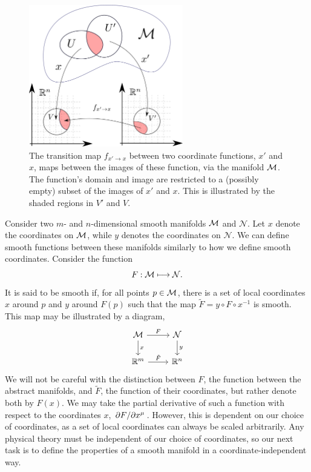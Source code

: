 %
\begin{figure}[H]
    \centering
    \includegraphics[width=0.6\textwidth]{figurer/transition_map.pdf}
    \caption{
        The transition map $f_{x'\rightarrow x}$ between two coordinate functions, $x'$ and $x$, maps between the images of these function, via the manifold $\mathcal{M}$. 
        The function's domain and image are restricted to a (possibly empty) subset of the images of $x'$ and $x$. This is illustrated by the shaded regions in $V'$ and $V$. 
        }
    \label{fig: transition map}
\end{figure}

Consider two $m$- and $n$-dimensional smooth manifolds $\mathcal{M}$ and $\mathcal N$.
Let $x$ denote the coordinates on $\mathcal{M}$, while $y$ denotes the coordinates on $\mathcal N$.
We can define smooth functions between these manifolds similarly to how we define smooth coordinates.
Consider the function
%
\begin{equation}
    F: \mathcal{M} \longmapsto \mathcal N.
\end{equation}
%
It is said to be smooth if, for all points $p \in\mathcal{M}$, there is a set of local coordinates $x$ around $p$ and $y$ around $F(p)$ such that the map $\tilde F = y \circ F \circ x^{-1}$ is smooth.
This map may be illustrated by a diagram,
%
\begin{equation}
\begin{tikzcd}
    \mathcal M \arrow[d, "x"] \arrow[r, "F"] & \mathcal N \arrow[d, "y"] \\
    \mathbb R^m \arrow[r, "\tilde F"]               & \mathbb R^n              
    \end{tikzcd}
\end{equation}
%
%
We will not be careful with the distinction between $F$, the function between the abstract manifolds, and $\tilde F$, the function of their coordinates, but rather denote both by $F(x)$.
We may take the partial derivative of such a function with respect to the coordinates $x$, $\pdv{F}/{x^\mu}$.
However, this is dependent on our choice of coordinates, as a set of local coordinates can always be scaled arbitrarily.
Any physical theory must be independent of our choice of coordinates, so our next task is to define the properties of a smooth manifold in a coordinate-independent way.


